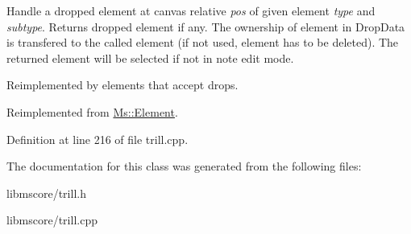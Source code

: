 Handle a dropped element at canvas relative {\itshape pos} of given element {\itshape type} and {\itshape subtype}. Returns dropped element if any. The ownership of element in Drop\+Data is transfered to the called element (if not used, element has to be deleted). The returned element will be selected if not in note edit mode.

Reimplemented by elements that accept drops. 

Reimplemented from \hyperlink{class_ms_1_1_element_a0ca69a9fb48e7b9fb481aacaf3860032}{Ms\+::\+Element}.



Definition at line 216 of file trill.\+cpp.



The documentation for this class was generated from the following files\+:\begin{DoxyCompactItemize}
\item 
libmscore/trill.\+h\item 
libmscore/trill.\+cpp\end{DoxyCompactItemize}
